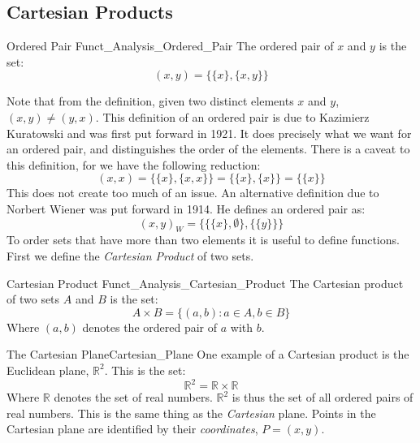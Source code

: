         \subsection{Cartesian Products}
            \begin{ldefinition}{Ordered Pair}
                  {Funct_Analysis_Ordered_Pair}
                The \gls{ordered pair} of $x$ and $y$ is the set:
                \begin{equation}
                    (x,y)=\big\{\{x\},\{x,y\}\big\}
                \end{equation}
            \end{ldefinition}
            Note that from the definition, given two distinct
            elements $x$ and $y$, $(x,y)\ne(y,x)$. This definition
            of an ordered pair is due to Kazimierz Kuratowski
            and was first put forward in 1921. It does precisely
            what we want for an ordered pair, and distinguishes
            the order of the elements. There is a caveat to this
            definition, for we have the following reduction:
            \begin{equation}
                (x,x)=\big\{\{x\},\{x,x\}\big\}
                =\big\{\{x\},\{x\}\big\}
                =\big\{\{x\}\big\}
            \end{equation}
            This does not create too much of an issue. An
            alternative definition due to Norbert Wiener was put
            forward in 1914. He defines an ordered pair as:
            \begin{equation}
                (x,y)_{W}=\Big\{\big\{\{x\},\emptyset\big\},
                    \big\{\{y\}\big\}\Big\}
            \end{equation}
            To order sets that have more than two elements it is
            useful to define functions. First we define the
            \textit{Cartesian Product} of two sets.
            \begin{ldefinition}{Cartesian Product}
                  {Funct_Analysis_Cartesian_Product}
                The \gls{Cartesian product} of two sets $A$ and $B$ is the set:
                \begin{equation}
                    A\times{B}=\{(a,b):a\in{A},b\in{B}\}
                \end{equation}
                Where $(a,b)$ denotes the ordered pair of $a$ with $b$.
            \end{ldefinition}
            \begin{lexample}{The Cartesian Plane}{Cartesian_Plane}
                One example of a Cartesian product is the Euclidean plane,
                $\mathbb{R}^{2}$. This is the set:
                \begin{equation}
                    \mathbb{R}^{2}=\mathbb{R}\times\mathbb{R}
                \end{equation}
                Where $\mathbb{R}$ denotes the set of real numbers.
                $\mathbb{R}^{2}$ is thus the set of all ordered pairs of real
                numbers. This is the same thing as the \textit{Cartesian}
                plane. Points in the Cartesian plane are identified by their
                \textit{coordinates}, $P=(x,y)$.
            \end{lexample}
